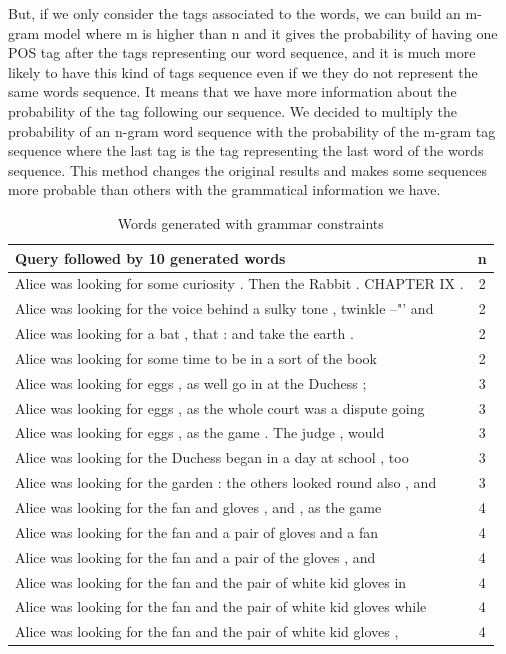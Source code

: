 \documentclass[a4paper,12pt]{article}
\begin{document}
But, if we only consider the tags associated to the words, we can build an m-gram model where m is higher than n and it gives the probability of having one POS tag after the tags representing our word sequence, and it is much more likely to have this kind of tags sequence even if we they do not represent the same words sequence. It means that we have more information about the probability of the tag following our sequence. We decided to multiply the probability of an n-gram word sequence with the probability of the m-gram tag sequence where the last tag is the tag representing the last word of the words sequence. This method changes the original results and makes some sequences more probable than others with the grammatical information we have.

\begin{table}[]
\centering
\small
\caption{Words generated with grammar constraints}
\label{grammarsent}
\begin{tabular}{| l |c|}
\hline
Query followed by 10 generated words                                   & n \\ \hline
Alice was looking for some curiosity . Then the Rabbit . CHAPTER IX .  & 2 \\ \hline
Alice was looking for the voice behind a sulky tone , twinkle --"' and & 2 \\ \hline
Alice was looking for a bat , that : and take the earth .              & 2 \\ \hline
Alice was looking for some time to be in a sort of the book            & 2 \\ \hline
Alice was looking for eggs , as well go in at the Duchess ;            & 3 \\ \hline
Alice was looking for eggs , as the whole court was a dispute going    & 3 \\ \hline
Alice was looking for eggs , as the game . The judge , would           & 3 \\ \hline
Alice was looking for the Duchess began in a day at school , too       & 3 \\ \hline
Alice was looking for the garden : the others looked round also , and  & 3 \\ \hline
Alice was looking for the fan and gloves , and , as the game           & 4 \\ \hline
Alice was looking for the fan and a pair of gloves and a fan           & 4 \\ \hline
Alice was looking for the fan and a pair of the gloves , and           & 4 \\ \hline
Alice was looking for the fan and the pair of white kid gloves in      & 4 \\ \hline
Alice was looking for the fan and the pair of white kid gloves while   & 4 \\ \hline
Alice was looking for the fan and the pair of white kid gloves ,       & 4 \\ \hline
\end{tabular}
\end{table}
\end{document}
